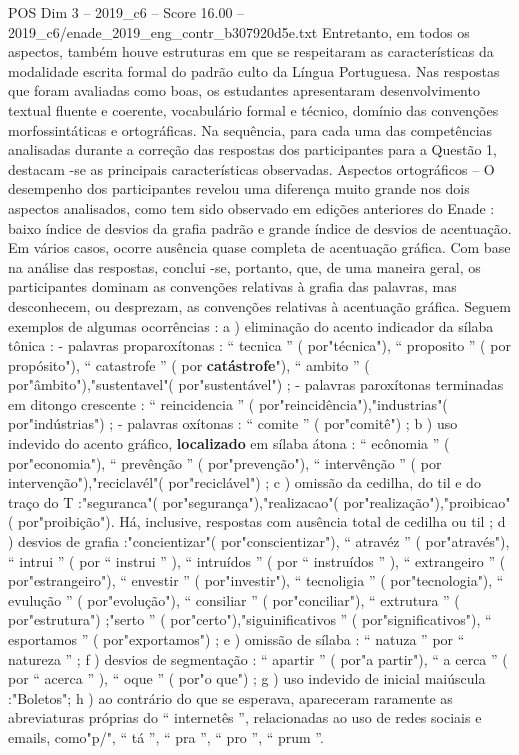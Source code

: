 \begin{textsample}{POS Dim 3 – 2019\_c6 – Score 16.00 – 2019\_c6/enade\_2019\_eng\_contr\_b307920d5e.txt}
Entretanto, em todos os aspectos, também houve estruturas em que se respeitaram as características da modalidade escrita formal do padrão culto da Língua Portuguesa.
Nas respostas que foram avaliadas como boas, os estudantes apresentaram desenvolvimento textual fluente e coerente, vocabulário formal e técnico, domínio das convenções morfossintáticas e ortográficas.
Na sequência, para cada uma das competências analisadas durante a correção das respostas dos participantes para a Questão 1, destacam -se as principais características observadas.
Aspectos ortográficos – O desempenho dos participantes revelou uma diferença muito grande nos dois aspectos analisados, como tem sido observado em edições anteriores do Enade : baixo índice de desvios da grafia padrão e grande índice de desvios de acentuação.
Em vários casos, ocorre ausência quase completa de acentuação gráfica.
Com base na análise das respostas, conclui -se, portanto, que, de uma maneira geral, os participantes dominam as convenções relativas à grafia das palavras, mas desconhecem, ou desprezam, as convenções relativas à acentuação gráfica.
Seguem exemplos de algumas ocorrências : a ) eliminação do acento indicador da sílaba tônica : - palavras proparoxítonas : “ tecnica ” ( por"técnica"), “ proposito ” ( por propósito"), “ catastrofe ” ( por \textbf{catástrofe}"), “ ambito ” ( por"âmbito"),"sustentavel"( por"sustentável") ; - palavras paroxítonas terminadas em ditongo crescente : “ reincidencia ” ( por"reincidência"),"industrias"( por"indústrias") ; - palavras oxítonas : “ comite ” ( por"comitê") ; b ) uso indevido do acento gráfico, \textbf{localizado} em sílaba átona : “ ecônomia ” ( por"economia"), “ prevênção ” ( por"prevenção"), “ intervênção ” ( por intervenção"),"reciclavél"( por"reciclável") ; c ) omissão da cedilha, do til e do traço do T :"seguranca"( por"segurança"),"realizacao"( por"realização"),"proibicao"( por"proibição").
Há, inclusive, respostas com ausência total de cedilha ou til ; d ) desvios de grafia :"concientizar"( por"conscientizar"), “ atravéz ” ( por"através"), “ intrui ” ( por “ instrui ” ), “ intruídos ” ( por “ instruídos ” ), “ extrangeiro ” ( por"estrangeiro"), “ envestir ” ( por"investir"), “ tecnoligia ” ( por"tecnologia"), “ evulução ” ( por"evolução"), “ consiliar ” ( por"conciliar"), “ extrutura ” ( por"estrutura") ;"serto ” ( por"certo"),"siguinificativos ” ( por"significativos"), “ esportamos ” ( por"exportamos") ; e ) omissão de sílaba : “ natuza ” por “ natureza ” ; f ) desvios de segmentação : “ apartir ” ( por"a partir"), “ a cerca ” ( por “ acerca ” ), “ oque ” ( por"o que") ; g ) uso indevido de inicial maiúscula :"Boletos"; h ) ao contrário do que se esperava, apareceram raramente as abreviaturas próprias do “ internetês ”, relacionadas ao uso de redes sociais e emails, como"p/", “ tá ”, “ pra ”, “ pro ”, “ prum ”.

\end{textsample}
